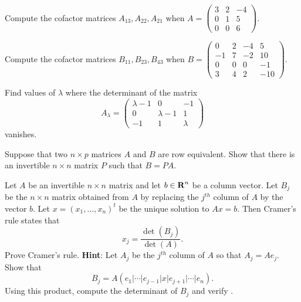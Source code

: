 \begin{exercise} \label{c10.1.b7a}
Compute the cofactor matrices $A_{13}, A_{22}, A_{21}$ when 
$A = \left( \begin{array}{rrr}
 3 & 2 & -4\\
 0 & 1 & 5\\
 0 & 0 & 6\end{array} \right)$.
\end{exercise}
\begin{exercise} \label{c10.1.b7b}
Compute the cofactor matrices $B_{11}, B_{23}, B_{43}$ when
$B = \left( \begin{array}{rrrr}
 0 & 2 & -4 & 5\\
 -1 & 7 & -2 & 10\\
 0 & 0 & 0  & -1\\
3 & 4 & 2 & -10
\end{array} \right)$.
\end{exercise}

\begin{exercise} \label{c10.1.c7}
Find values of $\lambda$ where the determinant of the matrix
\[
A_\lambda = \left( \begin{array}{ccr}
 \lambda -1 & 0 & -1\\
 0 & \lambda -1 & 1\\
-1 & 1 & \lambda 
\end{array} \right)
\]
vanishes.  
\end{exercise}

\begin{exercise}  \label{c10.1.c8} 
Suppose that two $n\times p$ matrices $A$ and $B$ are row
equivalent.  Show that there is an invertible
$n\times n$ matrix $P$ such that $B = PA$.
\end{exercise}

\begin{exercise} \label{c10.1.c9}
Let $A$ be an invertible $n\times n$ matrix and let $b\in\mbox{$\bf{R}$}^n$ be a column 
vector. Let $B_j$ be the $n\times n$ matrix obtained from $A$ by replacing the 
$j^{th}$ column of $A$ by the vector $b$.  Let $x=(x_1,\ldots,x_n)^t$ be the 
unique solution to $Ax=b$. Then Cramer's rule  states that
\begin{equation}  \label{E:cramer2}
x_j = \frac{\det(B_j)}{\det(A)}.
\end{equation}
Prove Cramer's rule.  {\bf Hint}: Let $A_j$ be the $j^{th}$ column of $A$ so
that $A_j = Ae_j$.  Show that 
\[
B_j = A (e_1|\cdots|e_{j-1}|x|e_{j+1}|\cdots|e_n).
\]
Using this product, compute the determinant of $B_j$ and verify .
\end{exercise}

